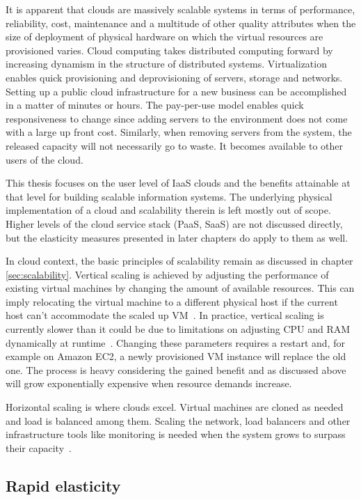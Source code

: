 \documentclass[english]{tktltiki2}
\theoremstyle{definition}
\theoremstyle{remark}
\begin{document}
It is apparent that clouds are massively scalable systems in terms of
performance, reliability, cost, maintenance and a multitude of other quality
attributes when the size of deployment of physical hardware on which the virtual
resources are provisioned varies. Cloud computing takes distributed computing
forward by increasing dynamism in the structure of distributed systems.
Virtualization enables quick provisioning and deprovisioning of servers, storage
and networks. Setting up a public cloud infrastructure for a new business can be
accomplished in a matter of minutes or hours. The pay-per-use model enables
quick responsiveness to change since adding servers to the environment does not
come with a large up front cost. Similarly, when removing servers from the
system, the released capacity will not necessarily go to waste. It becomes
available to other users of the cloud.

This thesis focuses on the user level of IaaS clouds and the benefits attainable
at that level for building scalable information systems. The underlying physical
implementation of a cloud and scalability therein is left mostly out of scope.
Higher levels of the cloud service stack (PaaS, SaaS) are not discussed
directly, but the elasticity measures presented in later chapters do apply to
them as well.

In cloud context, the basic principles of scalability remain as discussed in
chapter \ref{sec:scalability}. Vertical scaling is achieved by adjusting the
performance of existing virtual machines by changing the amount of available
resources. This can imply relocating the virtual machine to a different physical
host if the current host can’t accommodate the scaled up
VM~\cite{Verma2010-CostOfReconfigurationInCloud}. In practice, vertical scaling
is currently slower than it could be due to limitations on adjusting CPU and RAM
dynamically at runtime~\cite{VRB11}. Changing these parameters requires a
restart and, for example on Amazon EC2, a newly provisioned VM instance will
replace the old one. The process is heavy considering the gained benefit and as
discussed above will grow exponentially expensive when resource demands
increase.

Horizontal scaling is where clouds excel. Virtual machines are cloned as needed
and load is balanced among them. Scaling the network, load balancers and other
infrastructure tools like monitoring is needed when the system grows to surpass
their capacity~\cite{VRB11}.

\subsection{Rapid elasticity}
\end{document}
